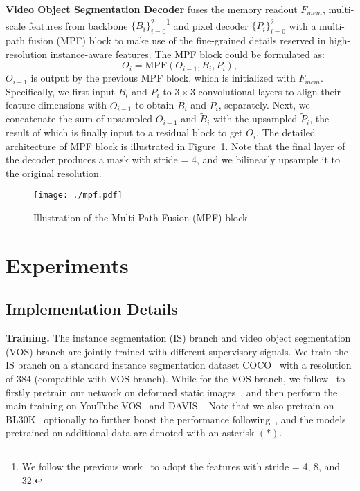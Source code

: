 \documentclass[10pt,twocolumn,letterpaper]{article}
\begin{document}
\vspace{0.02in}
\noindent \textbf{Video Object Segmentation Decoder} fuses the memory readout $F_{mem}$, multi-scale features from backbone $\{B_{i}\}_{i=0}^{2}$\footnote{We follow the previous work~\cite{oh2019video,cheng2021stcn,cheng2022xmem} to adopt the features with stride = 4, 8, and 32. } and pixel decoder $\{P_{i}\}_{i=0}^{2}$ with a multi-path fusion (MPF) block to make use of the fine-grained details reserved in high-resolution instance-aware features. The MPF block could be formulated as:
\begin{equation}
    O_{i} = \mathrm{MPF}(O_{i-1}, B_{i}, P_{i}),
    \label{formulation:mpf}
\end{equation}
$O_{i-1}$ is output by the previous MPF block, which is initialized with $F_{mem}$. Specifically, we first input $B_{i}$ and $P_{i}$ to $3\times3$ convolutional layers to align their feature dimensions with $O_{i-1}$ to obtain $\tilde{B}_{i}$ and $\tilde{P}_{i}$, separately. Next, we concatenate the sum of upsampled $O_{i-1}$ and $\tilde{B}_{i}$ with the upsampled $\tilde{P}_{i}$, the result of which is finally input to a residual block to get $O_{i}$. The detailed architecture of MPF block is illustrated in Figure~\ref{fig:vos_decoder}. Note that the final layer of the decoder produces a mask with stride = 4, and we bilinearly upsample it to the original resolution. 

\begin{figure}[t]
  \centering
  \texttt{[image: ./mpf.pdf]}
   \vspace{-0.25in}
   \caption{Illustration of the Multi-Path Fusion (MPF) block.}
   \label{fig:vos_decoder}
\end{figure}

\section{Experiments}
\label{sec:exp}
\subsection{Implementation Details}
\label{subsec:implementation}
\noindent \textbf{Training.} The instance segmentation (IS) branch and video object segmentation (VOS) branch are jointly trained with different supervisory signals. We train the IS branch on a standard instance segmentation dataset COCO~\cite{lin2014microsoft} with a resolution of 384 (compatible with VOS branch). While for the VOS branch, we follow~\cite{oh2019video,seong2020kernelized,liang2020video,cheng2021stcn,cheng2022xmem} to firstly pretrain our network on deformed static images~\cite{cheng2020cascadepsp,li2020fss,shi2015hierarchical,wang2017learning,zeng2019towards}, and then perform the main training on YouTube-VOS~\cite{xu2018YouTube}
and DAVIS~\cite{pont20172017}. Note that we also pretrain on BL30K~\cite{chang2015shapenet,denninger2019blenderproc,cheng2021mivos} optionally to further boost the performance following~\cite{cheng2021stcn,cheng2022xmem}, and the models pretrained on additional data are denoted with an asterisk $(*)$.  
\end{document}
